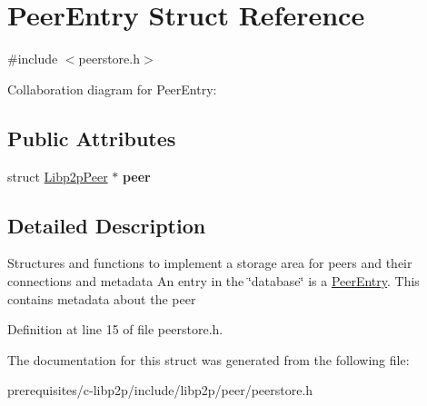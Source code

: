 \hypertarget{struct_peer_entry}{}\section{Peer\+Entry Struct Reference}
\label{struct_peer_entry}


{\ttfamily \#include $<$peerstore.\+h$>$}



Collaboration diagram for Peer\+Entry\+:
\subsection*{Public Attributes}
\begin{DoxyCompactItemize}
\item 
\mbox{\label{struct_peer_entry_ab991af673b91881b4ca18b2775b16b83}} 
struct \mbox{\hyperlink{struct_libp2p_peer}{Libp2p\+Peer}} $\ast$ {\bfseries peer}
\end{DoxyCompactItemize}


\subsection{Detailed Description}
Structures and functions to implement a storage area for peers and their connections and metadata An entry in the \char`\"{}database\char`\"{} is a \mbox{\hyperlink{struct_peer_entry}{Peer\+Entry}}. This contains metadata about the peer 

Definition at line 15 of file peerstore.\+h.



The documentation for this struct was generated from the following file\+:\begin{DoxyCompactItemize}
\item 
prerequisites/c-\/libp2p/include/libp2p/peer/peerstore.\+h\end{DoxyCompactItemize}
